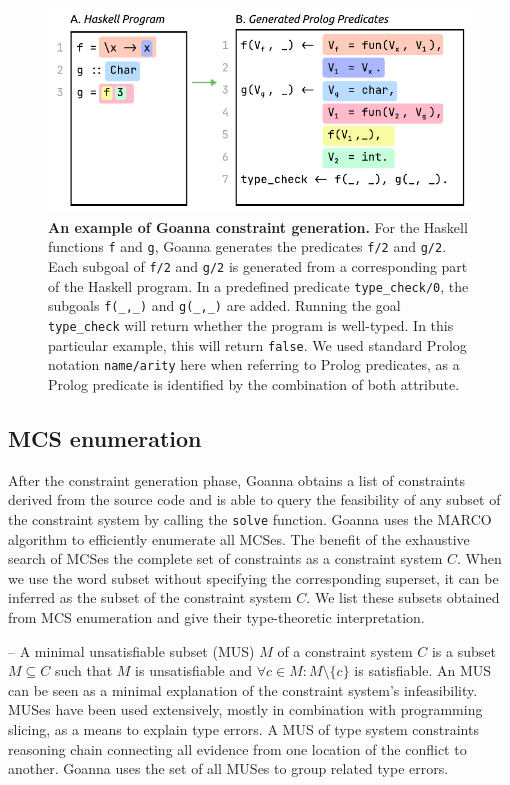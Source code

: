 \documentclass[pdflatex,sn-mathphys-num]{sn-jnl}%
\begin{document}
  \begin{figure}[htb]
        \centering
    \includegraphics[width=0.7\linewidth]{images/Translation-Example}
        \caption[An example of Goanna constraint generation]{\textbf{An example of Goanna constraint generation.} For the Haskell functions \texttt{f} and \texttt{g}, Goanna generates the predicates \texttt{f/2} and \texttt{g/2}. Each subgoal of \texttt{f/2} and \texttt{g/2} is generated from a corresponding part of the Haskell program. In a predefined predicate \texttt{type\_check/0}, the subgoals \texttt{f(\_,\_)} and \texttt{g(\_,\_)} are added. Running the goal \texttt{type\_check} will return whether the program is well-typed. In this particular example, this will return \texttt{false}. We used standard Prolog notation \texttt{name/arity} here when referring to Prolog predicates, as a Prolog predicate is identified by the combination of both attribute. 
}
        \label{fig:translation-example}
    \end{figure}
    

    \subsection{MCS enumeration} \label{sub:enumeration}
    After the constraint generation phase, Goanna obtains a list of constraints derived from the source code and is able to query the feasibility of any subset of the constraint system by calling the \texttt{solve} function. Goanna uses the MARCO algorithm \cite{Liffiton2016-xi} to efficiently enumerate all MCSes. The benefit of the exhaustive search of MCSes the complete set of constraints as a constraint system $C$. When we use the word subset without specifying the corresponding superset, it can be inferred as the subset of the constraint system $C$. We list these subsets obtained from MCS enumeration and give their type-theoretic interpretation. 
    
        
    – A minimal unsatisfiable subset (MUS) $M$ of a constraint system $C$ is a subset $M \subseteq C$ such that $M$ is unsatisfiable and $ \forall{c} \in M : M \setminus \{c\}$ is satisfiable. An MUS can be seen as a minimal explanation of the constraint system’s infeasibility. MUSes have been used extensively, mostly in combination with programming slicing, as a means to explain type errors. A MUS of type system constraints reasoning chain connecting all evidence from one location of the conflict to another. Goanna uses the set of all MUSes to group related type errors.
\end{document}
